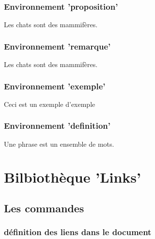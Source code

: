 \subsection{Environnement 'proposition' }

\begin{proposition}
Les chats sont des mammifères.
\end{proposition}

\subsection{Environnement 'remarque' }

\begin{remarque}
Les chats sont des mammifères.
\end{remarque}

\subsection{Environnement 'exemple' }

\begin{exemple}
Ceci est un exemple d'exemple
\end{exemple}

\subsection{Environnement 'definition' }

\begin{definition}
Une phrase est un ensemble de mots.
\end{definition}



\chapter{Bilbiothèque 'Links'}


\section{Les commandes}


\subsection{définition des liens dans le document}

